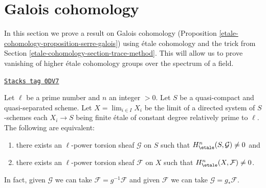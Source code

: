 \section{Galois cohomology}
\label{etale-cohomology-section-galois-cohomology}
In this section we prove a result on Galois cohomology
(Proposition \ref{etale-cohomology-proposition-serre-galois})
using \'etale cohomology and the trick from
Section \ref{etale-cohomology-section-trace-method}.
This will allow us to prove vanishing of higher \'etale cohomology groups
over the spectrum of a field.

\begin{lemma}
\label{etale-cohomology-lemma-nonvanishing-inherited}
\href{https://stacks.math.columbia.edu/tag/0DV7}{\texttt{Stacks tag 0DV7}}

Let $\ell$ be a prime number and $n$ an integer $> 0$.
Let $S$ be a quasi-compact and quasi-separated scheme.
Let $X = \lim_{i \in I} X_i$ be the limit of a
directed system of $S$-schemes each $X_i \to S$
being finite \'etale of constant degree relatively prime to $\ell$.
The following are equivalent:
\begin{enumerate}
\item there exists an $\ell$-power torsion sheaf
$\mathcal{G}$ on $S$ such that $H_\etale^n(S, \mathcal{G}) \neq 0$ and
\item there exists an $\ell$-power torsion sheaf $\mathcal{F}$ on $X$
such that $H_\etale^n(X, \mathcal{F}) \neq 0$.
\end{enumerate}
In fact, given
$\mathcal{G}$ we can take $\mathcal{F} = g^{-1}\mathcal{F}$
and given
$\mathcal{F}$ we can take $\mathcal{G} = g_*\mathcal{F}$.
\end{lemma}

